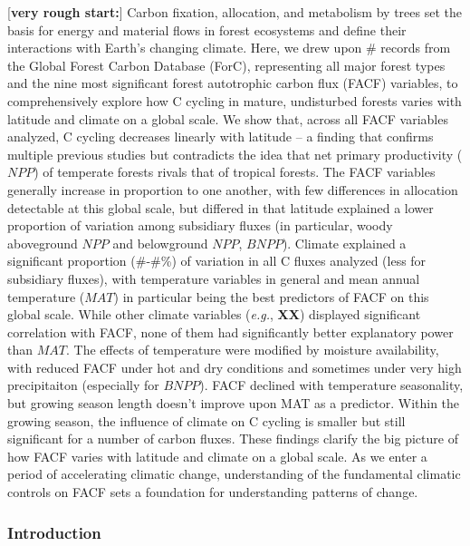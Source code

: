 \documentclass[]{article}
\begin{document}
{[}\textbf{very rough start:}{]} Carbon fixation, allocation, and
metabolism by trees set the basis for energy and material flows in
forest ecosystems and define their interactions with Earth's changing
climate. Here, we drew upon \# records from the Global Forest Carbon
Database (ForC), representing all major forest types and the nine most
significant forest autotrophic carbon flux (FACF) variables, to
comprehensively explore how C cycling in mature, undisturbed forests
varies with latitude and climate on a global scale. We show that, across
all FACF variables analyzed, C cycling decreases linearly with latitude
-- a finding that confirms multiple previous studies but contradicts the
idea that net primary productivity (\(NPP\)) of temperate forests rivals
that of tropical forests. The FACF variables generally increase in
proportion to one another, with few differences in allocation detectable
at this global scale, but differed in that latitude explained a lower
proportion of variation among subsidiary fluxes (in particular, woody
aboveground \(NPP\) and belowground \(NPP\), \(BNPP\)). Climate
explained a significant proportion (\#-\#\%) of variation in all C
fluxes analyzed (less for subsidiary fluxes), with temperature variables
in general and mean annual temperature (\(MAT\)) in particular being the
best predictors of FACF on this global scale. While other climate
variables (\emph{e.g.}, \textbf{XX}) displayed significant correlation
with FACF, none of them had significantly better explanatory power than
\(MAT\). The effects of temperature were modified by moisture
availability, with reduced FACF under hot and dry conditions and
sometimes under very high precipitaiton (especially for \(BNPP\)). FACF
declined with temperature seasonality, but growing season length doesn't
improve upon MAT as a predictor. Within the growing season, the
influence of climate on C cycling is smaller but still significant for a
number of carbon fluxes. These findings clarify the big picture of how
FACF varies with latitude and climate on a global scale. As we enter a
period of accelerating climatic change, understanding of the fundamental
climatic controls on FACF sets a foundation for understanding patterns
of change.

\newpage

\subsubsection{Introduction}\label{introduction}
\end{document}
